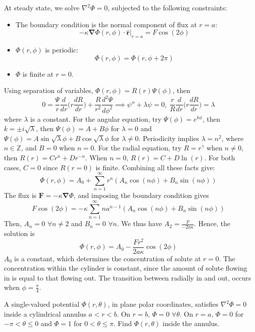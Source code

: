 \documentclass[a4paper]{article}
\begin{document}
\begin{ans}
At steady state, we solve $\nabla^2\Phi=0$, subjected to the following constraints:
\begin{itemize}
    \item The boundary condition is the normal component of flux at $r=a$: 
$$-\kappa\boldsymbol{\nabla}\Phi(r,\phi)\cdot\boldsymbol{\hat{r}}|_{r=a}=F\cos(2\phi)$$
\item $\Phi(r,\phi)$ is periodic:
$$\Phi(r,\phi)=\Phi(r,\phi+2\pi)$$
\item $\Phi$ is finite at $r=0$.
\end{itemize}
Using separation of variables, $\Phi(r,\phi)=R(r)\Psi(\phi)$, then
$$0=\frac{\Psi}{r}\frac{d}{dr}\bigg(r\frac{dR}{dr}\bigg)+\frac{R}{r^2}\frac{d^2\Psi}{d\phi^2}\implies \psi''+\lambda\psi=0,~\frac{r}{R}\frac{d}{dr}\bigg(r\frac{dR}{dr}\bigg)=\lambda$$
where $\lambda$ is a constant. For the angular equation, try $\Psi(\phi)=e^{k\phi}$, then $k=\pm i\sqrt{\lambda}$, then $\Psi(\phi)=A+B\phi$ for $\lambda=0$ and $\Psi(\phi)=A\sin\sqrt{\lambda}\phi+B\cos\sqrt{\lambda}\phi$ for $\lambda\neq 0$. Periodicity implies $\lambda=n^2$, where $n\in\mathbb{Z}$, and $B=0$ when $n=0$. For the radial equation, try $R=r^\gamma$ when $n\neq 0$, then $R(r)=Cr^n+Dr^{-n}$. When $n=0$, $R(r)=C+D\ln(r)$. For both cases, $C=0$ since $R(r=0)$ is finite. Combining all these facts give:
$$\Phi(r,\phi)=A_0+\sum_{n=1}^\infty r^n(A_n\cos(n\phi)+B_n\sin(n\phi))$$
The flux is $\mathbf{F}=-\kappa\boldsymbol{\nabla}\Phi$, and imposing the boundary condition gives
$$F\cos(2\phi)=-\kappa\sum_{n=1}^\infty na^{n-1}(A_n\cos(n\phi)+B_n\sin(n\phi))$$
Then, $A_n=0$ $\forall n\neq 2$ and $B_n=0$ $\forall n$. We thus have $A_2=\frac{F}{-2a\kappa}$. Hence, the solution is $$\Phi(r,\phi)=A_0-\frac{Fr^2}{2a\kappa}\cos(2\phi)$$ 
$A_0$ is a constant, which determines the concentration of solute at $r=0$. The concentration within the cylinder is constant, since the amount of solute flowing in is equal to that flowing out. The transition between radially in and out, occurs when $\phi=\frac{\pi}{4}$.
\end{ans}
\newpage
\begin{qns}
A single-valued potential $\Phi(r,\theta)$, in plane polar coordinates, satisfies $\nabla^2\Phi=0$ inside a cylindrical annulus $a < r < b$. On $r = b$, $\Phi=0$ $\forall\theta$. On $r = a$, $\Phi=0$ for $-\pi<\theta\leq0$ and $\Phi=1$ for $0<\theta\leq\pi$. Find $\Phi(r,\theta)$ inside the annulus.
\end{qns}
\end{document}
